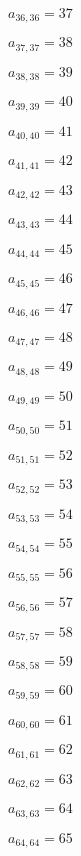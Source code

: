 \documentclass[a4paper,12pt]{article}
\begin{document}
$a _{ 36, 36 } = 37$

$a _{ 37, 37 } = 38$

$a _{ 38, 38 } = 39$

$a _{ 39, 39 } = 40$

$a _{ 40, 40 } = 41$

$a _{ 41, 41 } = 42$

$a _{ 42, 42 } = 43$

$a _{ 43, 43 } = 44$

$a _{ 44, 44 } = 45$

$a _{ 45, 45 } = 46$

$a _{ 46, 46 } = 47$

$a _{ 47, 47 } = 48$

$a _{ 48, 48 } = 49$

$a _{ 49, 49 } = 50$

$a _{ 50, 50 } = 51$

$a _{ 51, 51 } = 52$

$a _{ 52, 52 } = 53$

$a _{ 53, 53 } = 54$

$a _{ 54, 54 } = 55$

$a _{ 55, 55 } = 56$

$a _{ 56, 56 } = 57$

$a _{ 57, 57 } = 58$

$a _{ 58, 58 } = 59$

$a _{ 59, 59 } = 60$

$a _{ 60, 60 } = 61$

$a _{ 61, 61 } = 62$

$a _{ 62, 62 } = 63$

$a _{ 63, 63 } = 64$

$a _{ 64, 64 } = 65$
\end{document}
